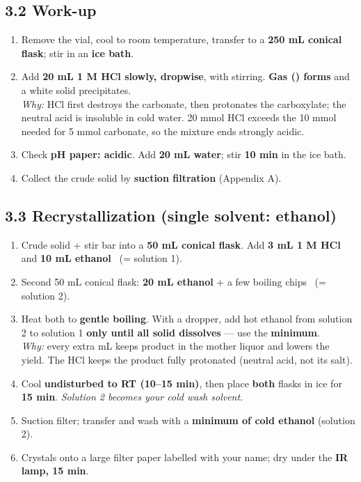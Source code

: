 \documentclass[10pt,a4paper]{article}
\begin{document}
\subsection*{3.2 Work-up}
\begin{enumerate}[leftmargin=7mm,itemsep=1.2mm,label=\cbox\ \arabic*.,resume]
\item Remove the vial, cool to room temperature, transfer to a \textbf{250 mL conical flask}; stir in an \textbf{ice bath}.
\item Add \textbf{20 mL 1 M HCl slowly, dropwise}, with stirring. \textbf{Gas () forms} and a white solid precipitates.\\
{\footnotesize \emph{Why:} HCl first destroys the carbonate, then protonates the carboxylate; the neutral acid is insoluble in cold water. 20 mmol HCl exceeds the 10 mmol needed for 5 mmol carbonate, so the mixture ends strongly acidic.}
\item Check \textbf{pH paper: acidic}. Add \textbf{20 mL water}; stir \textbf{10 min} in the ice bath.
\item Collect the crude solid by \textbf{suction filtration} (Appendix A).
\end{enumerate}

\subsection*{3.3 Recrystallization (single solvent: ethanol)}
\begin{enumerate}[leftmargin=7mm,itemsep=1.2mm,label=\cbox\ \arabic*.,resume]
\item Crude solid + stir bar into a \textbf{50 mL conical flask}. Add \textbf{3 mL 1 M HCl} and \textbf{10 mL ethanol} \ (= solution 1).
\item Second 50 mL conical flask: \textbf{20 mL ethanol} + a few boiling chips \ (= solution 2).
\item Heat both to \textbf{gentle boiling}. With a dropper, add hot ethanol from solution 2 to solution 1 \textbf{only until all solid dissolves} --- use the \textbf{minimum}.\\
{\footnotesize \emph{Why:} every extra mL keeps product in the mother liquor and lowers the yield. The HCl keeps the product fully protonated (neutral acid, not its salt).}
\item Cool \textbf{undisturbed to RT (10--15 min)}, then place \textbf{both} flasks in ice for \textbf{15 min}. \emph{Solution 2 becomes your cold wash solvent.}
\item Suction filter; transfer and wash with a \textbf{minimum of cold ethanol} (solution 2).
\item Crystals onto a large filter paper labelled with your name; dry under the \textbf{IR lamp, 15 min}.
\end{enumerate}
\end{document}
